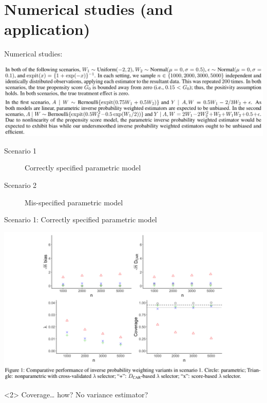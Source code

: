 \documentclass[smaller]{beamer}\usepackage{listings}
\begin{document}
\section{Numerical studies (and application)}
\label{sec:orgdb4b453}
\begin{frame}[label={sec:org03954c7}]{Numerical studies:}
\begin{center}
\includegraphics[width=1\textwidth]{./screenshots/numerical-results.png}
\end{center}

\begin{description}
\item[{Scenario 1}] Correctly specified parametric model
\item[{Scenario 2}] Mis-specified parametric model
\end{description}
\end{frame}

\begin{frame}[label={sec:org21a583c}]{Scenario 1: Correctly specified parametric model}
\begin{center}
\includegraphics[width=1\textwidth]{./screenshots/scenario1.png}
\end{center}

\begin{block}<2>{\color{red} Coverage\ldots{} how?}
No variance estimator?
\end{block}
\end{frame}
\end{document}
